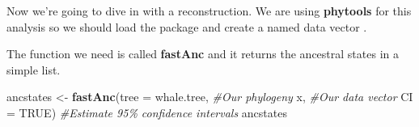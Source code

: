 \documentclass[
]{book}
\newenvironment{Shaded}{\begin{snugshade}}{\end{snugshade}}
\newcommand{\CommentTok}[1]{\textcolor[rgb]{0.56,0.35,0.01}{\textit{#1}}}
\newcommand{\DataTypeTok}[1]{\textcolor[rgb]{0.13,0.29,0.53}{#1}}
\newcommand{\KeywordTok}[1]{\textcolor[rgb]{0.13,0.29,0.53}{\textbf{#1}}}
\newcommand{\NormalTok}[1]{#1}
\newcommand{\OperatorTok}[1]{\textcolor[rgb]{0.81,0.36,0.00}{\textbf{#1}}}
\newcommand{\OtherTok}[1]{\textcolor[rgb]{0.56,0.35,0.01}{#1}}
\newcommand{\StringTok}[1]{\textcolor[rgb]{0.31,0.60,0.02}{#1}}
\begin{document}
Now we're going to dive in with a reconstruction. We are using \textbf{phytools} for this analysis so we should load the package and create a named data vector \citep{phytools}.

\begin{Shaded}
\end{Shaded}

The function we need is called \textbf{fastAnc} and it returns the ancestral states in a simple list.

\begin{Shaded}
\begin{Highlighting}[]
\NormalTok{ancstates \textless{}{-}}\StringTok{ }\KeywordTok{fastAnc}\NormalTok{(}\DataTypeTok{tree =}\NormalTok{ whale.tree,   }\CommentTok{\#Our phylogeny}
\NormalTok{                     x,                   }\CommentTok{\#Our data vector}
                     \DataTypeTok{CI =} \OtherTok{TRUE}\NormalTok{)           }\CommentTok{\#Estimate 95\% confidence intervals}
\NormalTok{ancstates}
\end{Highlighting}
\end{Shaded}
\end{document}
